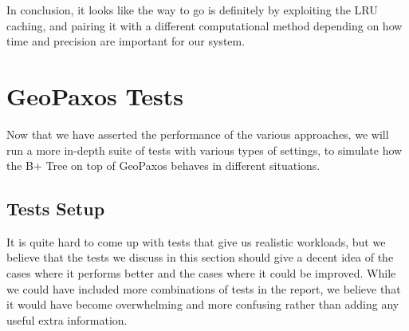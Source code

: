 In conclusion, it looks like the way to go is definitely by exploiting the LRU caching, and pairing it with a different computational method depending on how time and precision are important for our system.

\section{GeoPaxos Tests}\label{sec:geopaxos-tests}
Now that we have asserted the performance of the various approaches, we will run a more in-depth suite of tests with various types of settings, to simulate how the B+ Tree on top of GeoPaxos behaves in different situations.
\subsection{Tests Setup}\label{sec:tests-setup}
It is quite hard to come up with tests that give us realistic workloads, but we believe that the tests we discuss in this section should give a decent idea of the cases where it performs better and the cases where it could be improved. While we could have included more combinations of tests in the report, we believe that it would have become overwhelming and more confusing rather than adding any useful extra information.

